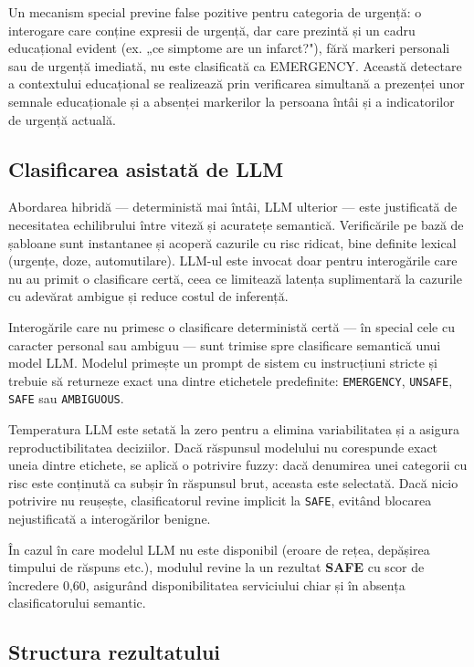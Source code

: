 \documentclass[12pt, a4paper, oneside, romanian]{teza-upb}
\begin{document}
Un mecanism special previne false pozitive pentru categoria de urgență: o interogare care conține expresii de urgență, dar care prezintă și un cadru educațional evident (ex. „ce simptome are un infarct?"), fără markeri personali sau de urgență imediată, nu este clasificată ca EMERGENCY. Această detectare a contextului educațional se realizează prin verificarea simultană a prezenței unor semnale educaționale și a absenței markerilor la persoana întâi și a indicatorilor de urgență actuală.

\subsection{Clasificarea asistată de LLM}

Abordarea hibridă — deterministă mai întâi, LLM ulterior — este justificată de necesitatea echilibrului între viteză și acuratețe semantică. Verificările pe bază de șabloane sunt instantanee și acoperă cazurile cu risc ridicat, bine definite lexical (urgențe, doze, automutilare). LLM-ul este invocat doar pentru interogările care nu au primit o clasificare certă, ceea ce limitează latența suplimentară la cazurile cu adevărat ambigue și reduce costul de inferență.

Interogările care nu primesc o clasificare deterministă certă — în special cele cu caracter personal sau ambiguu — sunt trimise spre clasificare semantică unui model LLM. Modelul primește un prompt de sistem cu instrucțiuni stricte și trebuie să returneze exact una dintre etichetele predefinite: \texttt{EMERGENCY}, \texttt{UNSAFE}, \texttt{SAFE} sau \texttt{AMBIGUOUS}.

Temperatura LLM este setată la zero pentru a elimina variabilitatea și a asigura reproductibilitatea deciziilor. Dacă răspunsul modelului nu corespunde exact uneia dintre etichete, se aplică o potrivire fuzzy: dacă denumirea unei categorii cu risc este conținută ca subșir în răspunsul brut, aceasta este selectată. Dacă nicio potrivire nu reușește, clasificatorul revine implicit la \texttt{SAFE}, evitând blocarea nejustificată a interogărilor benigne.

În cazul în care modelul LLM nu este disponibil (eroare de rețea, depășirea timpului de răspuns etc.), modulul revine la un rezultat \textbf{SAFE} cu scor de încredere 0,60, asigurând disponibilitatea serviciului chiar și în absența clasificatorului semantic.

\subsection{Structura rezultatului}
\end{document}
